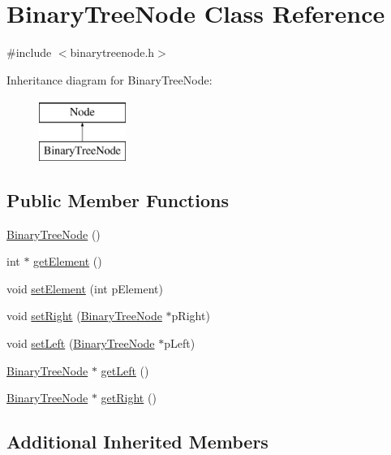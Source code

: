 \hypertarget{class_binary_tree_node}{\section{Binary\-Tree\-Node Class Reference}
\label{class_binary_tree_node}
}


{\ttfamily \#include $<$binarytreenode.\-h$>$}

Inheritance diagram for Binary\-Tree\-Node\-:\begin{figure}[H]
\begin{center}
\leavevmode
\includegraphics[height=2.000000cm]{class_binary_tree_node}
\end{center}
\end{figure}
\subsection*{Public Member Functions}
\begin{DoxyCompactItemize}
\item 
\hyperlink{class_binary_tree_node_ab3bb23139e61c1fc79b8bc88ff57c69a}{Binary\-Tree\-Node} ()
\item 
int $\ast$ \hyperlink{class_binary_tree_node_a3161f2539e55832d9c9e4a5d64a22af9}{get\-Element} ()
\item 
void \hyperlink{class_binary_tree_node_a7792f192717cf9ccf9927ff60c3311f4}{set\-Element} (int p\-Element)
\item 
void \hyperlink{class_binary_tree_node_a64c6449dea0fec8a2d2bf841710447bf}{set\-Right} (\hyperlink{class_binary_tree_node}{Binary\-Tree\-Node} $\ast$p\-Right)
\item 
void \hyperlink{class_binary_tree_node_ad9f908569d573364547aa1f0be50e5ef}{set\-Left} (\hyperlink{class_binary_tree_node}{Binary\-Tree\-Node} $\ast$p\-Left)
\item 
\hyperlink{class_binary_tree_node}{Binary\-Tree\-Node} $\ast$ \hyperlink{class_binary_tree_node_a7a1b0f9587bc5ff8ccf495bb22135e8a}{get\-Left} ()
\item 
\hyperlink{class_binary_tree_node}{Binary\-Tree\-Node} $\ast$ \hyperlink{class_binary_tree_node_a1c1d22f015c9ba0ce26699985281b040}{get\-Right} ()
\end{DoxyCompactItemize}
\subsection*{Additional Inherited Members}


